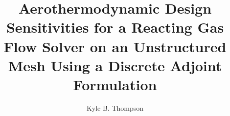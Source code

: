 \documentclass{beamer}
\title{Aerothermodynamic Design Sensitivities for a Reacting Gas Flow Solver
  on an Unstructured Mesh Using a Discrete Adjoint Formulation}
\author{ Kyle B. Thompson }
\begin{document}
\begin{frame}
  \titlepage
\end{frame}
\end{document}
